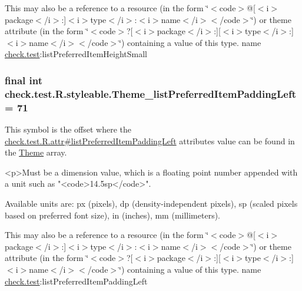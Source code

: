 This may also be a reference to a resource (in the form \char`\"{}$<$code$>$@\mbox{[}$<$i$>$package$<$/i$>$\+:\mbox{]}$<$i$>$type$<$/i$>$\+:$<$i$>$name$<$/i$>$$<$/code$>$\char`\"{}) or theme attribute (in the form \char`\"{}$<$code$>$?\mbox{[}$<$i$>$package$<$/i$>$\+:\mbox{]}\mbox{[}$<$i$>$type$<$/i$>$\+:\mbox{]}$<$i$>$name$<$/i$>$$<$/code$>$\char`\"{}) containing a value of this type.  name \hyperlink{namespacecheck_1_1test}{check.\+test}\+:list\+Preferred\+Item\+Height\+Small \hypertarget{classcheck_1_1test_1_1_r_1_1styleable_ae246fdddad967741c0a3101714a40ef3}{}
\subsubsection[{Theme\+\_\+list\+Preferred\+Item\+Padding\+Left}]{\setlength{\rightskip}{0pt plus 5cm}final int check.\+test.\+R.\+styleable.\+Theme\+\_\+list\+Preferred\+Item\+Padding\+Left = 71\hspace{0.3cm}{\ttfamily [static]}}\label{classcheck_1_1test_1_1_r_1_1styleable_ae246fdddad967741c0a3101714a40ef3}
This symbol is the offset where the \hyperlink{classcheck_1_1test_1_1_r_1_1attr_a5c876f039bc3f86b36be1456b3b363ae}{check.\+test.\+R.\+attr\#list\+Preferred\+Item\+Padding\+Left} attribute\textquotesingle{}s value can be found in the \hyperlink{classcheck_1_1test_1_1_r_1_1styleable_acca726d02016a0cf607782ec3a436a81}{Theme} array.

\begin{DoxyVerb}      <p>Must be a dimension value, which is a floating point number appended with a unit such as "<code>14.5sp</code>".
\end{DoxyVerb}
 Available units are\+: px (pixels), dp (density-\/independent pixels), sp (scaled pixels based on preferred font size), in (inches), mm (millimeters). 

This may also be a reference to a resource (in the form \char`\"{}$<$code$>$@\mbox{[}$<$i$>$package$<$/i$>$\+:\mbox{]}$<$i$>$type$<$/i$>$\+:$<$i$>$name$<$/i$>$$<$/code$>$\char`\"{}) or theme attribute (in the form \char`\"{}$<$code$>$?\mbox{[}$<$i$>$package$<$/i$>$\+:\mbox{]}\mbox{[}$<$i$>$type$<$/i$>$\+:\mbox{]}$<$i$>$name$<$/i$>$$<$/code$>$\char`\"{}) containing a value of this type.  name \hyperlink{namespacecheck_1_1test}{check.\+test}\+:list\+Preferred\+Item\+Padding\+Left \hypertarget{classcheck_1_1test_1_1_r_1_1styleable_a784a9d6670f4b87a95a04b867b4b4e7b}{}

